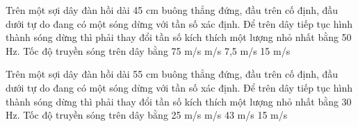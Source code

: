 
\begin{ex}%
Trên một sợi dây đàn hồi dài 45 cm buông thẳng đứng, đầu trên cố định, đầu dưới tự do đang có một sóng dừng với tần số xác định. Để trên dây tiếp tục hình thành sóng dừng thì phải thay đổi tần số kích thích một lượng nhỏ nhất bằng 50 Hz. Tốc độ truyền sóng trên dây bằng
\choice
{75 m/s}
{ m/s}
{7,5 m/s}
{15 m/s}
\end{ex} 
\begin{ex}%
Trên một sợi dây đàn hồi dài 55 cm buông thẳng đứng, đầu trên cố định, đầu dưới tự do đang có một sóng dừng với tần số xác định. Để trên dây tiếp tục hình thành sóng dừng thì phải thay đổi tần số kích thích một lượng nhỏ nhất bằng 30 Hz. Tốc độ truyền sóng trên dây bằng
\choice
{25 m/s}
{ m/s}
{43 m/s}
{15 m/s}
\end{ex} 

